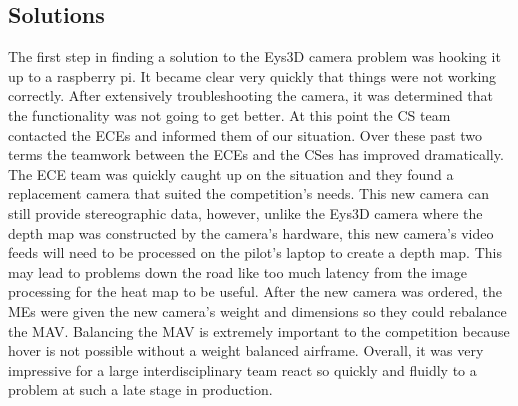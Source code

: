 \documentclass[onecolumn, oneside, letterpaper, draftclsnofoot, 10pt, compsoc]{IEEEtran}
\begin{document}
\subsection{Solutions}
The first step in finding a solution to the Eys3D camera problem was hooking it up to a raspberry pi. It became clear very quickly that things were not working correctly. After extensively troubleshooting the camera, it was determined that the functionality was not going to get better. At this point the CS team contacted the ECEs and informed them of our situation. Over these past two terms the teamwork between the ECEs and the CSes has improved dramatically. The ECE team was quickly caught up on the situation and they found a replacement camera that suited the competition's needs. This new camera can still provide stereographic data, however, unlike the Eys3D camera where the depth map was constructed by the camera's hardware, this new camera's video feeds will need to be processed on the pilot's laptop to create a depth map. This may lead to problems down the road like too much latency from the image processing for the heat map to be useful. After the new camera was ordered, the MEs were given the new camera's weight and dimensions so they could rebalance the MAV. Balancing the MAV is extremely important to the competition because hover is not possible without a weight balanced airframe. Overall, it was very impressive for a large interdisciplinary team react so quickly and fluidly to a problem at such a late stage in production.
\clearpage
\medskip


\end{document}
